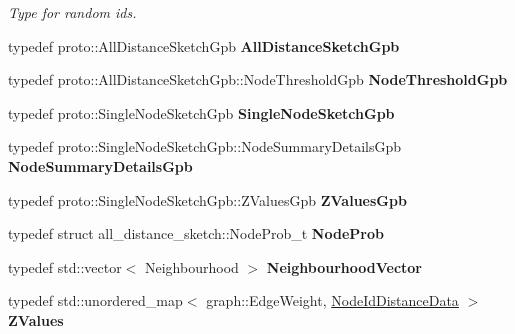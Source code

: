\begin{DoxyCompactItemize}
\begin{DoxyCompactList}\small\item\em Type for random ids. \end{DoxyCompactList}\item 
\hypertarget{namespaceall__distance__sketch_a5c92a8ad66531df4f1690f8fb4f96426}{}typedef proto\+::\+All\+Distance\+Sketch\+Gpb {\bfseries All\+Distance\+Sketch\+Gpb}\label{namespaceall__distance__sketch_a5c92a8ad66531df4f1690f8fb4f96426}

\item 
\hypertarget{namespaceall__distance__sketch_a670d91fdbfca59a9cd101180703f5349}{}typedef proto\+::\+All\+Distance\+Sketch\+Gpb\+::\+Node\+Threshold\+Gpb {\bfseries Node\+Threshold\+Gpb}\label{namespaceall__distance__sketch_a670d91fdbfca59a9cd101180703f5349}

\item 
\hypertarget{namespaceall__distance__sketch_a303e4823d16b1292aae19bffa3fcd302}{}typedef proto\+::\+Single\+Node\+Sketch\+Gpb {\bfseries Single\+Node\+Sketch\+Gpb}\label{namespaceall__distance__sketch_a303e4823d16b1292aae19bffa3fcd302}

\item 
\hypertarget{namespaceall__distance__sketch_ad8c3eac40af697c88f1f50bd46d985ec}{}typedef proto\+::\+Single\+Node\+Sketch\+Gpb\+::\+Node\+Summary\+Details\+Gpb {\bfseries Node\+Summary\+Details\+Gpb}\label{namespaceall__distance__sketch_ad8c3eac40af697c88f1f50bd46d985ec}

\item 
\hypertarget{namespaceall__distance__sketch_ac8383ac987018a0d79298578de7207db}{}typedef proto\+::\+Single\+Node\+Sketch\+Gpb\+::\+Z\+Values\+Gpb {\bfseries Z\+Values\+Gpb}\label{namespaceall__distance__sketch_ac8383ac987018a0d79298578de7207db}

\item 
\hypertarget{namespaceall__distance__sketch_afe1012f59c9acefad48d9c8b254f62da}{}typedef struct all\+\_\+distance\+\_\+sketch\+::\+Node\+Prob\+\_\+t {\bfseries Node\+Prob}\label{namespaceall__distance__sketch_afe1012f59c9acefad48d9c8b254f62da}

\item 
\hypertarget{namespaceall__distance__sketch_a1b6c1bccb4c2618347ee06c820a5ab9d}{}typedef std\+::vector$<$ Neighbourhood $>$ {\bfseries Neighbourhood\+Vector}\label{namespaceall__distance__sketch_a1b6c1bccb4c2618347ee06c820a5ab9d}

\item 
\hypertarget{namespaceall__distance__sketch_a96b3e5630ae959843fca081c4accb419}{}typedef std\+::unordered\+\_\+map$<$ graph\+::\+Edge\+Weight, \hyperlink{classall__distance__sketch_1_1NodeIdDistanceData}{Node\+Id\+Distance\+Data} $>$ {\bfseries Z\+Values}\label{namespaceall__distance__sketch_a96b3e5630ae959843fca081c4accb419}


\end{DoxyCompactItemize}
